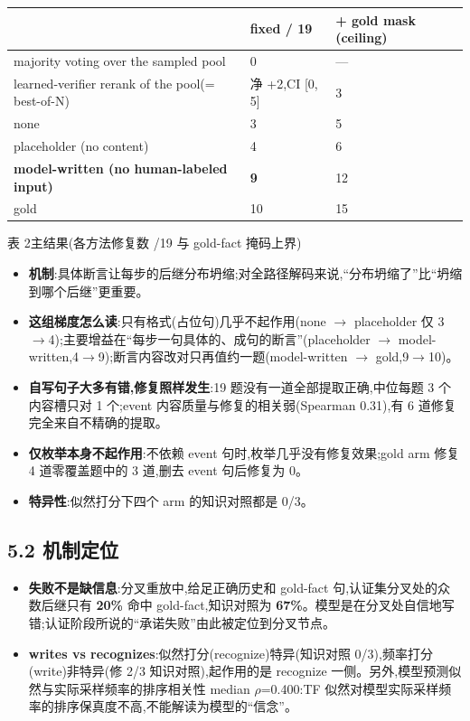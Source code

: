 \documentclass[fontset=none,10.5pt]{ctexart}
\begin{document}
\begin{center}\small
\begin{tabular}{@{}lll@{}}
\toprule
\rowcolor{tabhead} & fixed / 19 & + gold mask (ceiling) \\
\midrule
majority voting over the sampled pool & 0 & — \\
learned-verifier rerank of the pool(= best-of-N) & 净 +2,CI [0, 5] & 3 \\
\midrule
none & 3 & 5 \\
placeholder (no content) & 4 & 6 \\
\textbf{model-written (no human-labeled input)} & \textbf{9} & 12 \\
gold & 10 & 15 \\
\bottomrule
\end{tabular}

{\small\color{black!60}表 2\quad 主结果(各方法修复数 /19 与 gold-fact 掩码上界)}
\end{center}

\begin{itemize}
\item \textbf{机制}:具体断言让每步的后继分布坍缩;对全路径解码来说,``分布坍缩了''比``坍缩到哪个后继''更重要。
\item \textbf{这组梯度怎么读}:只有格式(占位句)几乎不起作用(none $\to$ placeholder 仅 3$\to$4);主要增益在``每步一句具体的、成句的断言''(placeholder $\to$ model-written,4$\to$9);断言内容改对只再值约一题(model-written $\to$ gold,9$\to$10)。
\item \textbf{自写句子大多有错,修复照样发生}:19 题没有一道全部提取正确,中位每题 3 个内容槽只对 1 个;event 内容质量与修复的相关弱(Spearman 0.31),有 6 道修复完全来自不精确的提取。
\item \textbf{仅枚举本身不起作用}:不依赖 event 句时,枚举几乎没有修复效果;gold arm 修复 4 道零覆盖题中的 3 道,删去 event 句后修复为 0。
\item \textbf{特异性}:似然打分下四个 arm 的知识对照都是 0/3。
\end{itemize}

\subsection{5.2 机制定位}

\begin{itemize}
\item \textbf{失败不是缺信息}:分叉重放中,给足正确历史和 gold-fact 句,认证集分叉处的众数后继只有 \textbf{20\%} 命中 gold-fact,知识对照为 \textbf{67\%}。模型是在分叉处自信地写错;认证阶段所说的``承诺失败''由此被定位到分叉节点。
\item \textbf{writes vs recognizes}:似然打分(recognize)特异(知识对照 0/3),频率打分(write)非特异(修 2/3 知识对照),起作用的是 recognize 一侧。另外,模型预测似然与实际采样频率的排序相关性 median $\rho$=0.400:TF 似然对模型实际采样频率的排序保真度不高,不能解读为模型的``信念''。
\end{itemize}
\end{document}
